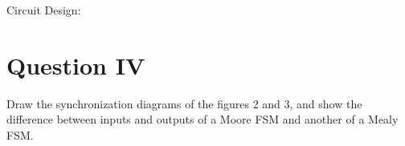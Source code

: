 \documentclass[12pt, a4paper]{article}
\begin{document}
	Circuit Design:
	\begin{center}
	\end{center}

	\section*{Question IV}
	Draw the synchronization diagrams of the figures 2 and 3, and show the difference between inputs and outputs of a Moore FSM and another of a Mealy FSM.
	
\end{document}
